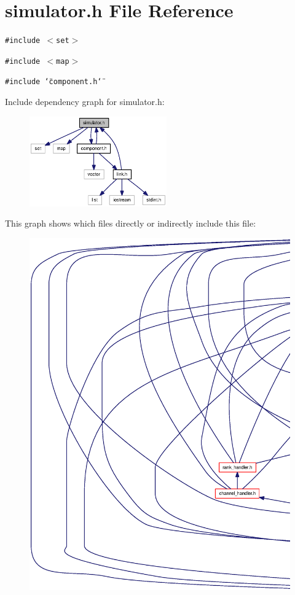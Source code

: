 \section{simulator.h File Reference}
\label{simulator_8h}
{\tt \#include $<$set$>$}\par
{\tt \#include $<$map$>$}\par
{\tt \#include \char`\"{}component.h\char`\"{}}\par


Include dependency graph for simulator.h:\nopagebreak
\begin{figure}[H]
\begin{center}
\leavevmode
\includegraphics[width=167pt]{simulator_8h__incl}
\end{center}
\end{figure}


This graph shows which files directly or indirectly include this file:\nopagebreak
\begin{figure}[H]
\begin{center}
\leavevmode
\includegraphics[width=420pt]{simulator_8h__dep__incl}
\end{center}
\end{figure}
